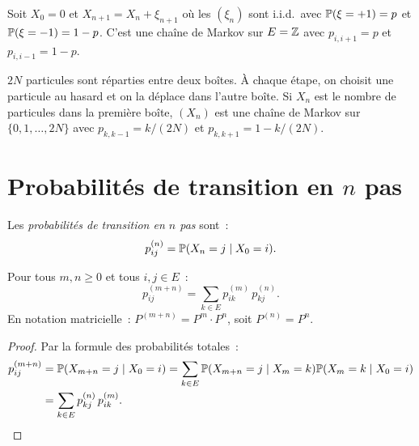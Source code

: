 \begin{exemple}
Soit $X_0 = 0$ et $X_{n+1} = X_n + \xi_{n+1}$ o\`u les $(\xi_n)$ sont i.i.d.\ avec
$\mathbb{P}(\xi = +1) = p$ et $\mathbb{P}(\xi = -1) = 1-p$. C'est une cha\^ine de Markov sur
$E = \mathbb{Z}$ avec $p_{i,i+1} = p$ et $p_{i,i-1} = 1-p$.
\end{exemple}

\begin{exemple}
$2N$ particules sont r\'eparties entre deux bo\^ites. \`A chaque \'etape, on choisit une
particule au hasard et on la d\'eplace dans l'autre bo\^ite. Si $X_n$ est le nombre de
particules dans la premi\`ere bo\^ite, $(X_n)$ est une cha\^ine de Markov sur
$\{0, 1, \ldots, 2N\}$ avec $p_{k,k-1} = k/(2N)$ et $p_{k,k+1} = 1 - k/(2N)$.
\end{exemple}

\section{Probabilit\'es de transition en $n$ pas}

\begin{definition}
Les \emph{probabilit\'es de transition en $n$ pas} sont~:
\[
    p_{ij}^{(n)} = \mathbb{P}(X_n = j \mid X_0 = i).
\]
\end{definition}

\begin{theoreme}
\label{thm:chapman_kolmogorov}
Pour tous $m, n \geq 0$ et tous $i, j \in E$~:
\[
    p_{ij}^{(m+n)} = \sum_{k \in E} p_{ik}^{(m)}\, p_{kj}^{(n)}.
\]
En notation matricielle~: $P^{(m+n)} = P^m \cdot P^n$, soit $P^{(n)} = P^n$.
\end{theoreme}

\begin{proof}
Par la formule des probabilit\'es totales~:
\begin{align*}
    p_{ij}^{(m+n)} &= \mathbb{P}(X_{m+n} = j \mid X_0 = i)
    = \sum_{k \in E} \mathbb{P}(X_{m+n} = j \mid X_m = k) \mathbb{P}(X_m = k \mid X_0 = i) \\
    &= \sum_{k \in E} p_{kj}^{(n)}\, p_{ik}^{(m)}.
\end{align*}
\end{proof}

